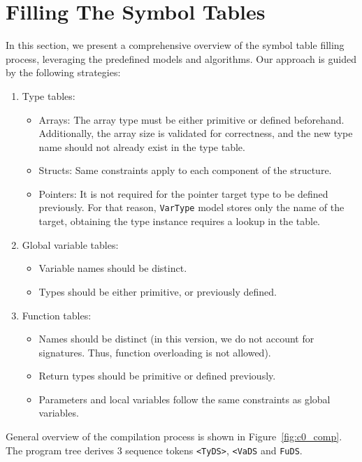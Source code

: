 \section{Filling The Symbol Tables}\label{sec:using-new-tools-for-filling-the-symbol-tables}
In this section, we present a comprehensive overview of the symbol table filling process, leveraging the predefined models and algorithms.
Our approach is guided by the following strategies:
\begin{enumerate}
    \item Type tables:
    \begin{itemize}
        \item Arrays: The array type must be either primitive or defined beforehand.
        Additionally, the array size is validated for correctness, and the new type name should not already exist in the type table.

        \item Structs: Same constraints apply to each component of the structure.
        \item Pointers: It is not required for the pointer target type to be defined previously.
        For that reason, \verb+VarType+ model stores only the name of the target, obtaining the type instance
        requires a lookup in the table.
    \end{itemize}
    \item Global variable tables:
    \begin{itemize}
        \item Variable names should be distinct.
        \item Types should be either primitive, or previously defined.
    \end{itemize}
    \item Function tables:
    \begin{itemize}
        \item Names should be distinct (in this version, we do not account for signatures.
        Thus, function overloading is not allowed).
        \item Return types should be primitive or defined previously.
        \item Parameters and local variables follow the same constraints as global variables.
    \end{itemize}
\end{enumerate}
\newpage
General overview of the compilation process is shown in Figure~\ref{fig:c0_comp}.
The program tree derives 3 sequence tokens \verb+<TyDS>+, \verb+<VaDS+ and \verb+FuDS+.
